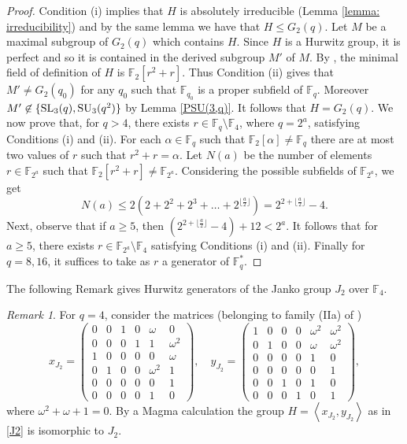 \documentclass{amsart}
\theoremstyle{remark}
\newtheorem{rem}[lemma]{Remark}
\begin{document}
\begin{proof}
Condition (i) implies that $H$ is absolutely irreducible (Lemma \ref{lemma: irreducibility}) and by the same
lemma we have that $H\leq G_2(q)$.  Let $M$ be a maximal subgroup of $G_2(q)$ which contains $H$. 
Since $H$ is a Hurwitz group, it is perfect and so it is contained in the derived subgroup $M'$ of $M$. 
By  \cite[Lemma 3.2]{TV}, the minimal field of definition of $H$ is ${\mathbb{F}}_2[ r^2+r]$. 
Thus Condition (ii) gives that $M'\neq G_2(q_0)$ for any $q_0$ such that ${\mathbb{F}}_{q_0}$ is a
proper subfield of ${\mathbb{F}}_q$.
Moreover $M'\not\in \{{\mathop{\rm SL}\nolimits}_3(q),{\mathop{\rm SU}\nolimits}_3(q^2)\}$ by Lemma \ref{PSU(3,q)}. It follows that $H=G_2(q)$.
We now prove that, for $q>4$, there exists $r\in {\mathbb{F}}_{q}\setminus {\mathbb{F}}_4$, where $q=2^a$, satisfying Conditions (i) and (ii).
For each $\alpha\in {\mathbb{F}}_q$ such that ${\mathbb{F}}_2[\alpha]\neq {\mathbb{F}}_q$ there are at most two values of $r$ such that $r^ 2+r=\alpha$.
Let $N(a)$ be the number of elements $r\in {\mathbb{F}}_{2^a}$ such that ${\mathbb{F}}_2[r^ 2+r]\neq {\mathbb{F}}_{2^a}$.
Considering the possible subfields of ${\mathbb{F}}_{2^a}$, we get
$$N(a)\leq 2\left(2+2^ 2+2^3+\ldots+2^ {\lfloor\frac{a}{2} \rfloor}\right)= 2^ {2+\lfloor\frac{a}{2} \rfloor}-4.$$ 
Next, observe that if $a\geq 5$, then 
$\left(2^ {2+\lfloor\frac{a}{2} \rfloor}-4 \right)+12<2^ a$.
It follows that for $a\geq 5$, there exists $r\in {\mathbb{F}}_{2^a}\setminus {\mathbb{F}}_4$ satisfying Conditions (i) and (ii).
Finally for $q=8,16$, it suffices to take as $r$ a generator of ${\mathbb{F}}_{q}^ \ast$.
\end{proof}
 
The following Remark gives Hurwitz generators of the Janko group $J_2$ over ${\mathbb{F}}_4$.

\begin{rem}
For $q=4$, consider the matrices (belonging to family (IIa) of \cite{V3})
\begin{equation}\label{J2}
x_{J_2}=\begin{pmatrix}
0 & 0 & 1 & 0 & \omega & 0 \\
0 & 0 & 0 & 1 & 1 & \omega^2\\
1 & 0 & 0 & 0 & 0 & \omega \\
0 & 1 & 0 & 0 & \omega^2 & 1 \\
0 & 0 & 0 & 0 & 0   & 1\\
0 & 0 & 0 & 0 & 1   & 0
    \end{pmatrix},\quad
y_{J_2}=\begin{pmatrix}
  1 & 0 & 0 & 0 & \omega^2 & \omega^2\\
  0 & 1 & 0 & 0 & \omega & \omega^2 \\
  0 & 0 & 0 & 0 & 1   & 0\\
  0 & 0 & 0 & 0 & 0   & 1 \\
  0 & 0 & 1 & 0 & 1   & 0 \\
  0 & 0 & 0 & 1 & 0   & 1
  \end{pmatrix},
\end{equation}
where $\omega^2+\omega+1=0$.
By a Magma calculation the group $H=\left\langle x_{J_2} , y_{J_2}\right\rangle$ as in \eqref{J2}
 is isomorphic to $J_2$.
 \end{rem}
\end{document}
